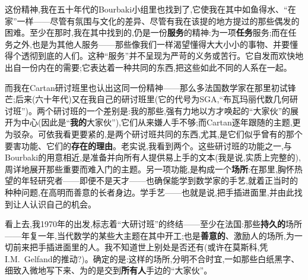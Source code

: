 这份精神,我在五十年代的Bourbaki小组里也找到了,它使我在其中如鱼得水、“在家”一样——尽管有氛围与文化的差异、尽管有我在该提的地方提过的那些偶发的困难。至少在那时,我在其中找到的,仍是一份\textbf{服务}的精神\dmark{}:为一项\textbf{任务}服务;而在任务之外,也是为其他人服务——那些像我们一样渴望懂得大大小小的事物、并要懂得个透彻到底的人们。这种“服务”并不呈现为严苛的义务或苦行。它自发而欢快地出自一份内在的需要;它表达着一种共同的东西,把这些如此不同的人系在一起。

而我在Cartan研讨班里也认出这同一份精神——那么多法国数学家在那里初试锋芒;后来(六十年代)又在我自己的研讨班里(它的代号为SGA,“布瓦玛丽代数几何研讨班”)。两个研讨班的一个差别是:我的那些,强有力地以方才唤起的“大家伙”的展开为中心(因此是“\textbf{我的}大家伙”),它们从来嫌人手不够;而Cartan逐年跟随的主题,更为驳杂。可依我看更要紧的,是两个研讨班共同的东西,尤其,是它们似乎曾有的那个要害功能、它们的\textbf{存在的理由}。老实说,我看到两个。这些研讨班的功能之一,与Bourbaki的用意相近,是准备并向所有人提供易上手的文本(我是说,实质上完整的),周详地展开那些重要而难入门的主题。另一项功能,是构成一个\textbf{场所}:在那里,胸怀热望的年轻研究者——即便不是天才——也确保能学到数学家的手艺,就着正当时的种种问题,在高明而善意的长者身边。学手艺——也就是说,把手插进面里,并由此找到让人认识自己的机会。

看上去,我1970年的出发,标志着“大研讨班”的终结——至少在法国:那些\textbf{持久的}场所——年复一年,当代数学的某些大主题在其中开工;也是\textbf{善意的}、激励人的场所,为一切前来把手插进面里的人\dmark{}。我不知道世上别处是否还有(或许在莫斯科,凭I.M.~Gelfand的推动?)。确定的是:这样的场所,分明不合时宜,一如那些白纸黑字、细致入微地写下来、为的是交到\textbf{所有人}手边的“大家伙”。

